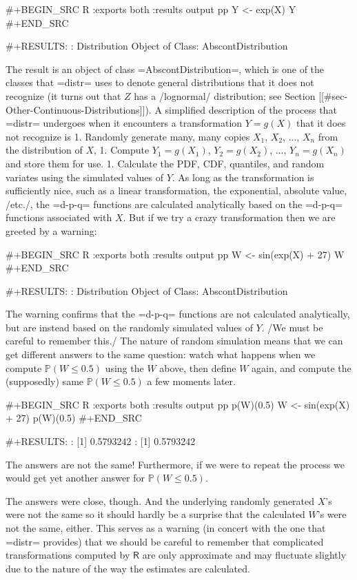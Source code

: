 #+BEGIN_SRC R :exports both :results output pp 
Y <- exp(X)
Y
#+END_SRC

#+RESULTS:
: Distribution Object of Class: AbscontDistribution

The result is an object of class =AbscontDistribution=, which is one
of the classes that =distr= uses to denote general distributions that
it does not recognize (it turns out that \(Z\) has a /lognormal/
distribution; see Section [[#sec-Other-Continuous-Distributions]]). A
simplified description of the process that =distr= undergoes when it
encounters a transformation \(Y=g(X)\) that it does not recognize is
1. Randomly generate many, many copies \(X_{1}\), \(X_{2}\), ...,
   \(X_{n}\) from the distribution of \(X\),
1. Compute \(Y_{1}=g(X_{1})\), \(Y_{2}=g(X_{2})\), ...,
   \(Y_{n}=g(X_{n})\) and store them for use.
1. Calculate the PDF, CDF, quantiles, and random variates using the
   simulated values of \(Y\).
As long as the transformation is sufficiently nice, such as a linear
transformation, the exponential, absolute value, /etc./, the =d-p-q=
functions are calculated analytically based on the =d-p-q= functions
associated with \(X\). But if we try a crazy transformation then we
are greeted by a warning:

#+BEGIN_SRC R :exports both :results output pp 
W <- sin(exp(X) + 27)
W
#+END_SRC

#+RESULTS:
: Distribution Object of Class: AbscontDistribution

The warning confirms that the =d-p-q= functions are not calculated
analytically, but are instead based on the randomly simulated values
of \(Y\). /We must be careful to remember this./ The nature of random
simulation means that we can get different answers to the same
question: watch what happens when we compute \(\mathbb{P}(W\leq0.5)\)
using the \(W\) above, then define \(W\) again, and compute the
(supposedly) same \(\mathbb{P}(W\leq0.5)\) a few moments later.

#+BEGIN_SRC R :exports both :results output pp 
p(W)(0.5)
W <- sin(exp(X) + 27)
p(W)(0.5)
#+END_SRC

#+RESULTS:
: [1] 0.5793242
: [1] 0.5793242

The answers are not the same! Furthermore, if we were to repeat the
process we would get yet another answer for \(\mathbb{P}(W\leq0.5)\).

The answers were close, though. And the underlying randomly generated
\(X\)'s were not the same so it should hardly be a surprise that the
calculated \(W\)'s were not the same, either. This serves as a warning
(in concert with the one that =distr= provides) that we should be
careful to remember that complicated transformations computed by
\(\mathsf{R}\) are only approximate and may fluctuate slightly due to
the nature of the way the estimates are calculated.

